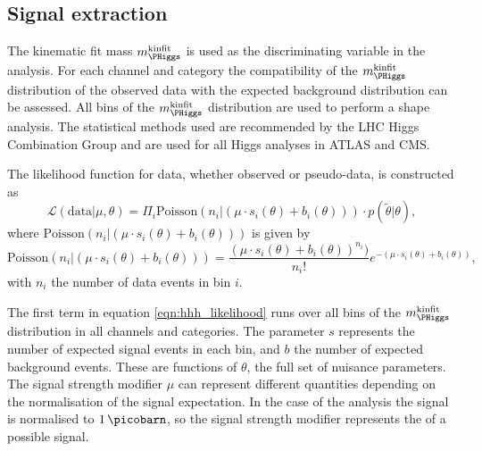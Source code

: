 \subsection{Signal extraction}
\label{sec:hhh_results_extraction}
The kinematic fit mass $m_{\PHiggs}^{\text{kinfit}}$ is used as the discriminating variable in the \Htohh analysis.
For each channel and category the compatibility of the $m_{\PHiggs}^{\text{kinfit}}$ distribution
of the observed data with the expected background distribution can be assessed. All bins
of the $m_{\PHiggs}^{\text{kinfit}}$ distribution are used to perform a shape analysis. The 
statistical methods used are recommended by the LHC Higgs Combination Group \cite{LHCHComb2011} 
and are used for all Higgs analyses in ATLAS and CMS. 

The likelihood function for data, whether observed or pseudo-data, is constructed as 
\begin{equation} \label{eqn:hhh_likelihood}
\mathcal{L}(\text{data}|\mu, \theta) = \Pi_i\text{Poisson}(n_{i}|(\mu\cdot s_i(\theta) + b_i(\theta)) )\cdot p(\tilde{\theta}|\theta),
\end{equation}
where $\text{Poisson}(n_{i}|(\mu\cdot s_i(\theta)+b_i(\theta)))$ is given by
\begin{equation}\label{eqn:hhh_poisson}
\text{Poisson}(n_{i}|(\mu\cdot s_i(\theta)+b_i(\theta))) = \frac{(\mu\cdot s_i(\theta) + b_i(\theta))^{n_i})}{n_i!}e^{-(\mu\cdot s_i(\theta)+b_i(\theta))},
\end{equation}
with $n_i$ the number of 
data events in bin $i$.

The first term in equation \ref{eqn:hhh_likelihood} runs over all bins of the $m_{\PHiggs}^{\text{kinfit}}$ distribution 
in all channels and categories. The parameter $s$ represents the number of expected signal events
in each bin, and $b$ the number of expected background events. These are functions of 
$\theta$, the full set of nuisance parameters. The signal strength
modifier $\mu$ can represent different quantities depending on the normalisation of the 
signal expectation. In the case of the \Htohhtobbtautau analysis the signal is normalised
to $1\,\picobarn$, so the signal strength modifier represents
the \xsbr of a possible signal.

